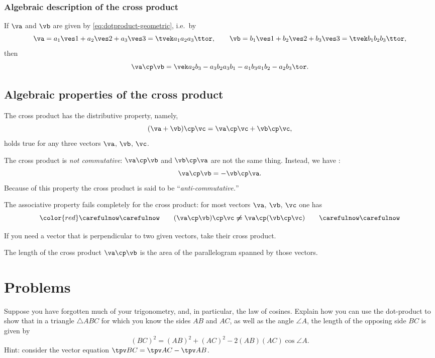 \subsubsection*{Algebraic description of the cross product} If $\va$ and $\vb $ are
given by \eqref{eq:dotproduct-geometric}, i.e.~by
\[
  \va = a_1\ves1+a_2\ves2+a_3\ves3=\tvek a_1 \\ a_2 \\ a_3 \ttor,\qquad
  \vb = b_1\ves1+b_2\ves2+b_3\ves3=\tvek b_1 \\ b_2 \\ b_3 \ttor,
\]
then
\[
  \va \cp\vb = 
  \vek
  a_2b_3 - a_3b_2\\
  a_3b_1 - a_1b_3\\
  a_1b_2 - a_2b_3
  \tor.
\]

\subsection*{Algebraic properties of the cross product}
The cross product has the distributive property, namely, 
\begin{equation}
  (\va+\vb)\cp\vc  = \va\cp\vc + \vb\cp\vc,
  \label{eq:cross-product-distributive}
\end{equation}
holds true for any three vectors $\va$, $\vb$, $\vc$.

The cross product is \emph{not commutative}:  $\va\cp\vb$ and $\vb\cp\va$
are not the same thing.  Instead, we have :
\begin{equation}
  \va\cp\vb = -\vb\cp\va.
\end{equation}
Because of this property the cross product is said to be ``\textit{anti-commutative.}''

The associative property fails completely for the cross product: for most vectors
$\va$, $\vb$, $\vc$ one has
\begin{equation}\color{red}
  \carefulnow\carefulnow\qquad
  (\va\cp\vb)\cp\vc\; {\boldsymbol \neq}\; \va\cp(\vb\cp\vc)
  \qquad \carefulnow\carefulnow
  \label{eq:cross-product-not-associative}
\end{equation}

If you need a vector that is perpendicular to two given vectors, take their cross
product.

The length of the cross product $\va\cp\vb$ is the area of the parallelogram spanned
by those vectors.

\section{Problems}  %
\problemfont
\problem \label{prb:law-of-cosines-and-dotprod} Suppose you have forgotten %
much of  your trigonometry, and, in particular, the law of cosines.  Explain how you
can use the dot-product to show that in a triangle $\triangle ABC$ for which you know
the sides $AB$ and $AC$, as well as the angle $\angle A$, the length of the opposing
side $BC$ is given by 
\[
  (BC)^2 = (AB)^2 + (AC)^2 - 2(AB)(AC)\cos\angle A.
\]
Hint: consider the vector equation $\tpv BC = \tpv AC - \tpv AB$.
\noproblemfont

